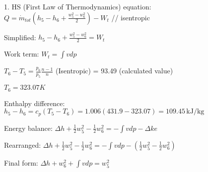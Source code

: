 1. HS (First Law of Thermodynamics) equation:  
\( Q = \dot{m}_{tot} (h_5 - h_6 + \frac{w_5^2 - w_6^2}{2}) - W_t \) // isentropic  

Simplified:  
\( h_5 - h_6 + \frac{w_5^2 - w_6^2}{2} = W_t \)  

Work term:  
\( W_t = \int v dp \)  

\( T_6 - T_5 = \frac{p_6}{p_5} \frac{n - 1}{n} \)  
(Isentropic) = 93.49 (calculated value)  

\( T_6 = 323.07 K \)  

Enthalpy difference:  
\( h_5 - h_6 = c_p (T_5 - T_6) = 1.006 (431.9 - 323.07) = 109.45 \, \text{kJ/kg} \)  

Energy balance:  
\( \Delta h + \frac{1}{2} w_5^2 - \frac{1}{2} w_6^2 = - \int v dp - \Delta ke \)  

Rearranged:  
\( \Delta h + \frac{1}{2} w_5^2 - \frac{1}{2} w_6^2 = - \int v dp - (\frac{1}{2} w_5^2 - \frac{1}{2} w_6^2) \)  

Final form:  
\( \Delta h + w_6^2 + \int v dp = w_5^2 \)